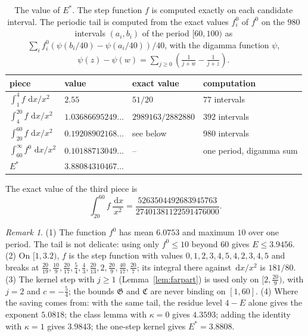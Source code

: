 \documentclass{amsart}
\theoremstyle{definition}
\theoremstyle{remark}
\newtheorem{remark}[theorem]{Remark}
\numberwithin{equation}{section}
\newcommand{\dd}{\,\mathrm{d}}
\begin{document}
\begin{table}[ht]
\centering
\small
\renewcommand{\arraystretch}{1.2}
\caption{The value of $E^*$. The step function $f$ is computed exactly on
each candidate interval. The periodic tail is computed from the exact values
$f^0_i$ of $f^0$ on the $980$ intervals $(a_i,b_i)$ of the period $[60,100)$ as
$\sum_if^0_i(\psi(b_i/40)-\psi(a_i/40))/40$, with the digamma function
$\psi$, $\psi(z)-\psi(w)=\sum_{j\ge0}(\frac1{j+w}-\frac1{j+z})$.}\label{tab:Estar}
\begin{tabular}{llll}
\hline
piece & value & exact value & computation\\
\hline
$\int_1^4f\,\dd x/x^2$ & $2.55$ & $51/20$ & $77$ intervals\\
$\int_4^{20}f\,\dd x/x^2$ & $1.03686695249\ldots$ & $2989163/2882880$ & $392$ intervals\\
$\int_{20}^{60}f\,\dd x/x^2$ & $0.19208902168\ldots$ & see below & $980$ intervals\\
$\int_{60}^\infty f^0\,\dd x/x^2$ & $0.10188713049\ldots$ & -- & one period, digamma sum\\
\hline
$E^*$ & $3.88084310467\ldots$ & & \\
\hline
\end{tabular}
\end{table}

The exact value of the third piece is
\[
  \int_{20}^{60}f\,\frac{\dd x}{x^2}=\frac{5263504492683945763}{27401381122591476000}.
\]

\begin{remark}\label{rem:A-details}
(1) The function $f^0$ has mean $6.0753$ and maximum $10$ over one period. The
tail is not delicate: using only $f^0\le10$ beyond $60$ gives
$E\le3.9456$.
(2) On $[1,3.2)$, $f$ is the step function with values $0,1,2,3,4,5,4,2,3,4,5$
and breaks at $\frac{20}{19},\frac{10}9,\frac{20}{17},\frac54,\frac43,
\frac{20}{13},2,\frac{20}9,\frac{40}{17},\frac{20}7$; its integral there
against $\dd x/x^2$ is $181/80$.
(3) The kernel step with $j\ge1$ (Lemma~\ref{lem:farpart}) is used only on
$[2,\frac{20}9)$, with $j=2$ and $c=-\frac54$; the bounds $\mathfrak G$ and
$\mathfrak C$ are never binding on $[1,60]$.
(4) Where the saving comes from: with the same tail, the residue level
$4-E$ alone gives the exponent $5.0818$; the class lemma with $\kappa=0$
gives $4.3593$; adding the identity with $\kappa=1$ gives $3.9843$; the
one-step kernel gives $E^*=3.8808$.
\end{remark}
\end{document}
